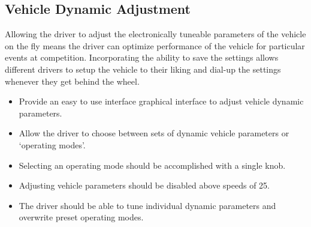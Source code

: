 \subsection{Vehicle Dynamic Adjustment}

Allowing the driver to adjust the electronically tuneable parameters of the vehicle on the fly means the driver can optimize performance of the vehicle for particular events at competition. Incorporating the ability to save the settings allows different drivers to setup the vehicle to their liking and dial-up the settings whenever they get behind the wheel.

\begin{itemize}
\item Provide an easy to use interface graphical interface to adjust vehicle dynamic parameters.
\item Allow the driver to choose between sets of dynamic vehicle parameters or `operating modes'.
\item Selecting an operating mode should be accomplished with a single knob.
\item Adjusting vehicle parameters should be disabled above speeds of \unit{25}{\kilo\metre\per\hour}.
\item The driver should be able to tune individual dynamic parameters and overwrite preset operating modes.
\end{itemize}

